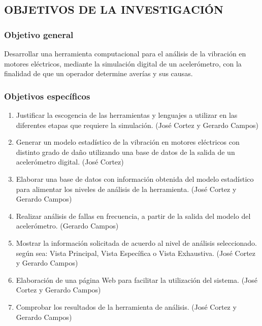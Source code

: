 \subsection{OBJETIVOS DE LA INVESTIGACIÓN}

\subsubsection{Objetivo general}
	Desarrollar una herramienta computacional para el análisis de la vibración en motores eléctricos, mediante la simulación digital de un acelerómetro, con la finalidad de que un operador determine averías y sus causas.


\subsubsection{Objetivos específicos}

	\begin{enumerate}
		\item Justificar la escogencia de las herramientas y lenguajes a utilizar en las diferentes etapas que requiere la simulación. (José Cortez y Gerardo Campos)

		\item Generar un modelo estadístico de la vibración en motores eléctricos con distinto grado de daño utilizando una base de datos de la salida de un acelerómetro digital. (José Cortez)

		\item Elaborar una base de datos con información obtenida del modelo estadístico para alimentar los niveles de análisis de la herramienta. (José Cortez y Gerardo Campos)

		\item Realizar análisis de fallas en frecuencia, a partir de la salida del modelo del acelerómetro. (Gerardo Campos)

		\item Mostrar la información solicitada de acuerdo al nivel de análisis seleccionado. según sea: Vista Principal, Vista Específica o Vista Exhaustiva. (José Cortez y Gerardo Campos)

		\item Elaboración de una página Web para facilitar la utilización del sistema. (José Cortez y Gerardo Campos)

		\item Comprobar los resultados de la herramienta de análisis. (José Cortez y Gerardo Campos)
	\end{enumerate}
